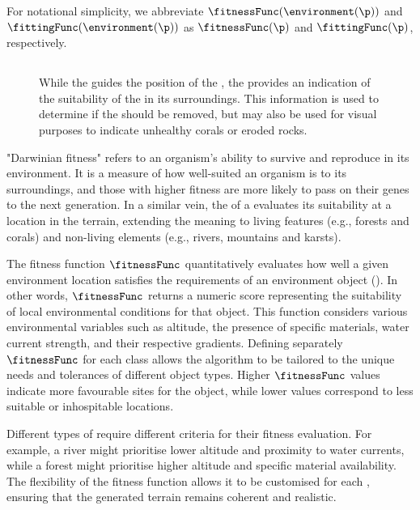 For notational simplicity, we abbreviate $\fitnessFunc(\environment(\p))$ and $\fittingFunc(\environment(\p))$ as $\fitnessFunc(\p)$ and $\fittingFunc(\p)$, respectively.

\subsection{}

\begin{figure}
    \caption{While the  guides the position of the , the  provides an indication of the suitability of the  in its surroundings. This information is used to determine if the  should be removed, but may also be used for visual purposes to indicate unhealthy corals or eroded rocks.}
    \label{fig:env-obj-procedural-erosion}
\end{figure}

"Darwinian fitness" refers to an organism's ability to survive and reproduce in its environment. It is a measure of how well-suited an organism is to its surroundings, and those with higher fitness are more likely to pass on their genes to the next generation. In a similar vein, the  of a  evaluates its suitability at a location in the terrain, extending the meaning to living features (e.g., forests and corals) and non-living elements (e.g., rivers, mountains and karsts).

The fitness function $\fitnessFunc$ quantitatively evaluates how well a given environment location satisfies the requirements of an environment object (). In other words, $\fitnessFunc$ returns a numeric score representing the suitability of local environmental conditions for that object. This function considers various environmental variables such as altitude, the presence of specific materials, water current strength, and their respective gradients. Defining separately $\fitnessFunc$ for each  class allows the algorithm to be tailored to the unique needs and tolerances of different object types. Higher $\fitnessFunc$ values indicate more favourable sites for the object, while lower values correspond to less suitable or inhospitable locations.

Different types of  require different criteria for their fitness evaluation. For example, a river might prioritise lower altitude and proximity to water currents, while a forest might prioritise higher altitude and specific material availability. The flexibility of the fitness function allows it to be customised for each , ensuring that the generated terrain remains coherent and realistic.


